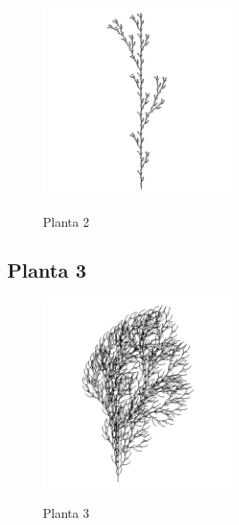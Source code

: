 \begin{figure}[H]
    \centering
    \includegraphics[width=0.5\textwidth]{figures/l-system-plant-2.png}
    \caption{Planta 2}
    \label{fig:plant-2}
    \cite{web-2023}
\end{figure}

\subsection{Planta 3}

\begin{figure}[H]
    \centering
    \includegraphics[width=0.5\textwidth]{figures/l-system-plant-3.png}
    \caption{Planta 3}
    \label{fig:plant-3}
    \cite{web-2023}
\end{figure}